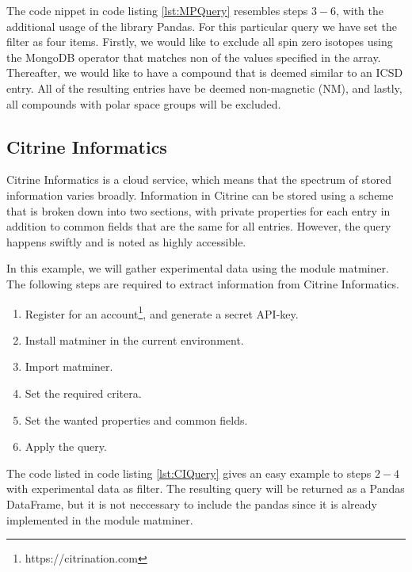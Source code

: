 The code nippet in code listing \ref{lst:MPQuery} resembles steps $3-6$, with the additional usage of the library Pandas. For this particular query we have set the filter as four items. Firstly, we would like to exclude all spin zero isotopes using the MongoDB operator that matches non of the values specified in the array. Thereafter, we would like to have a compound that is deemed similar to an ICSD entry. All of the resulting entries have be deemed non-magnetic (NM), and lastly, all compounds with polar space groups will be excluded.



\subsection{Citrine Informatics}

Citrine Informatics is a cloud service, which means that the spectrum of stored information varies broadly. Information in Citrine can be stored using a scheme that is broken down into two sections, with private properties for each entry in addition to common fields that are the same for all entries. However, the query happens swiftly and is noted as highly accessible.

In this example, we will gather experimental data using the module matminer. The following steps are required to extract information from Citrine Informatics.

\begin{enumerate}
  \item Register for an account\footnote{https://citrination.com}, and generate a secret API-key.
  \item Install matminer in the current environment.
  \item Import matminer.
  \item Set the required critera.
  \item Set the wanted properties and common fields.
  \item Apply the query.
\end{enumerate}

The code listed in code listing \ref{lst:CIQuery} gives an easy example to steps $2-4$ with experimental data as filter. The resulting query will be returned as a Pandas DataFrame, but it is not neccessary to include the pandas since it is already implemented in the module matminer.

